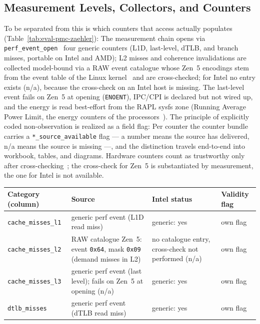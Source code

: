 \begin{nurkurz}
\subsection{Measurement Levels, Collectors, and Counters}\label{sec:eval-counters}
To be separated from this is which counters that access actually populates
(Table~\ref{tab:eval-pmc-zaehler}): The measurement chain opens via
\texttt{perf\_event\_open}~\cite{linux_perf_event_open,demelo2010perf} four generic counters (L1D,
last-level, dTLB, and branch misses, portable on Intel and AMD); L2 misses and coherence invalidations are
collected model-bound via a RAW event catalogue whose Zen~5 encodings stem from the event table of the Linux
kernel~\cite{linux_perf_amdzen5} and are cross-checked; for Intel no entry exists (n/a), because the
cross-check on an Intel host is missing. The last-level event fails on Zen~5 at opening (\texttt{ENOENT}),
IPC/CPI is declared but not wired up, and the energy is read best-effort from the RAPL sysfs zone (Running
Average Power Limit, the energy counters of the processors~\cite{david2010rapl,khan2018rapl}). The principle
of explicitly coded non-observation is realized as a field flag: Per counter the counter bundle carries a
\texttt{*\_source\_available} flag --- a number means the source has delivered, n/a means the source is
missing ---, and the distinction travels end-to-end into workbook, tables, and diagrams. Hardware counters
count as trustworthy only after cross-checking~\cite{weaver2008counters}; the cross-check for Zen~5 is
substantiated by measurement, the one for Intel is not available.
\begin{table}[htbp]\centering\footnotesize
\begin{tabular}{@{}l>{\raggedright\arraybackslash}p{4.6cm}>{\raggedright\arraybackslash}p{3.2cm}>{\raggedright\arraybackslash}p{2.3cm}@{}}
\toprule
Category (column) & Source & Intel status & Validity flag \\
\midrule
\texttt{cache\_misses\_l1} & generic perf event (L1D read miss) & generic: yes & own flag \\
\texttt{cache\_misses\_l2} & RAW catalogue Zen~5: event \texttt{0x64}, mask \texttt{0x09} (demand misses in L2) & no catalogue entry, cross-check not performed (n/a) & own flag \\ %
\texttt{cache\_misses\_l3} & generic perf event (last level); fails on Zen~5 at opening (n/a) & generic: yes & own flag \\
\texttt{dtlb\_misses} & generic perf event (dTLB read miss) & generic: yes & own flag \\

\end{tabular}
\end{table}
\end{nurkurz}
